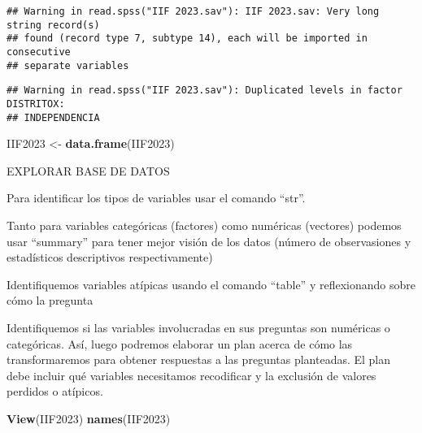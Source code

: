 \documentclass[
]{article}
\newenvironment{Shaded}{\begin{snugshade}}{\end{snugshade}}
\newcommand{\FunctionTok}[1]{\textcolor[rgb]{0.13,0.29,0.53}{\textbf{#1}}}
\newcommand{\NormalTok}[1]{#1}
\newcommand{\OtherTok}[1]{\textcolor[rgb]{0.56,0.35,0.01}{#1}}
\begin{document}
\begin{verbatim}
## Warning in read.spss("IIF 2023.sav"): IIF 2023.sav: Very long string record(s)
## found (record type 7, subtype 14), each will be imported in consecutive
## separate variables
\end{verbatim}

\begin{verbatim}
## Warning in read.spss("IIF 2023.sav"): Duplicated levels in factor DISTRITOX:
## INDEPENDENCIA
\end{verbatim}

\begin{Shaded}
\begin{Highlighting}[]
\NormalTok{IIF2023 }\OtherTok{\textless{}{-}} \FunctionTok{data.frame}\NormalTok{(IIF2023)}
\end{Highlighting}
\end{Shaded}

EXPLORAR BASE DE DATOS

Para identificar los tipos de variables usar el comando ``str''.

Tanto para variables categóricas (factores) como numéricas (vectores)
podemos usar ``summary'' para tener mejor visión de los datos (número de
observasiones y estadísticos descriptivos respectivamente)

Identifiquemos variables atípicas usando el comando ``table'' y
reflexionando sobre cómo la pregunta

Identifiquemos si las variables involucradas en sus preguntas son
numéricas o categóricas. Así, luego podremos elaborar un plan acerca de
cómo las transformaremos para obtener respuestas a las preguntas
planteadas. El plan debe incluir qué variables necesitamos recodificar y
la exclusión de valores perdidos o atípicos.

\begin{Shaded}
\begin{Highlighting}[]
\FunctionTok{View}\NormalTok{(IIF2023)}
\FunctionTok{names}\NormalTok{(IIF2023) }
\end{Highlighting}
\end{Shaded}
\end{document}
